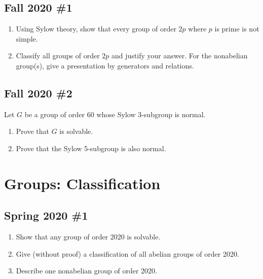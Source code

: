 \hypertarget{fall-2020-1}{%
\subsection{Fall 2020 \#1}\label{fall-2020-1}}

\begin{enumerate}
\def\labelenumi{\alph{enumi}.}
\item
  Using Sylow theory, show that every group of order \(2p\) where \(p\)
  is prime is not simple.
\item
  Classify all groups of order \(2p\) and justify your answer. For the
  nonabelian group(s), give a presentation by generators and relations.
\end{enumerate}

\hypertarget{fall-2020-2}{%
\subsection{Fall 2020 \#2}\label{fall-2020-2}}

Let \(G\) be a group of order 60 whose Sylow 3-subgroup is normal.

\begin{enumerate}
\def\labelenumi{\alph{enumi}.}
\item
  Prove that \(G\) is solvable.
\item
  Prove that the Sylow 5-subgroup is also normal.
\end{enumerate}

\hypertarget{groups-classification}{%
\section{Groups: Classification}\label{groups-classification}}

\hypertarget{spring-2020-1}{%
\subsection{Spring 2020 \#1}\label{spring-2020-1}}

\begin{enumerate}
\def\labelenumi{\alph{enumi}.}
\item
  Show that any group of order 2020 is solvable.
\item
  Give (without proof) a classification of all abelian groups of order
  2020.
\item
  Describe one nonabelian group of order 2020.
\end{enumerate}

